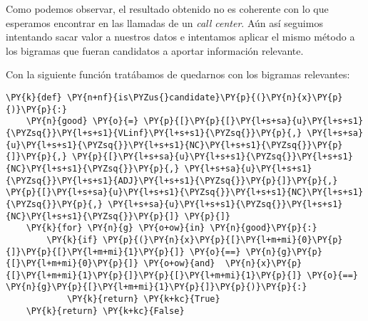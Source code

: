 Como podemos observar, el resultado obtenido no es coherente con lo que esperamos encontrar en las llamadas de un \textit{call center}. Aún así seguimos intentando sacar valor a nuestros datos e intentamos aplicar el mismo método a los bigramas que fueran candidatos a aportar información relevante. 

Con la siguiente función tratábamos de quedarnos con los bigramas relevantes: 
\vspace{0.5cm}

    \begin{tcolorbox}[breakable, size=fbox, boxrule=1pt, pad at break*=1mm,colback=cellbackground, colframe=cellborder]
\begin{Verbatim}[commandchars=\\\{\}]
\PY{k}{def} \PY{n+nf}{is\PYZus{}candidate}\PY{p}{(}\PY{n}{x}\PY{p}{)}\PY{p}{:}
	\PY{n}{good} \PY{o}{=} \PY{p}{[}\PY{p}{[}\PY{l+s+sa}{u}\PY{l+s+s1}{\PYZsq{}}\PY{l+s+s1}{VLinf}\PY{l+s+s1}{\PYZsq{}}\PY{p}{,} \PY{l+s+sa}{u}\PY{l+s+s1}{\PYZsq{}}\PY{l+s+s1}{NC}\PY{l+s+s1}{\PYZsq{}}\PY{p}{]}\PY{p}{,} \PY{p}{[}\PY{l+s+sa}{u}\PY{l+s+s1}{\PYZsq{}}\PY{l+s+s1}{NC}\PY{l+s+s1}{\PYZsq{}}\PY{p}{,} \PY{l+s+sa}{u}\PY{l+s+s1}{\PYZsq{}}\PY{l+s+s1}{ADJ}\PY{l+s+s1}{\PYZsq{}}\PY{p}{]}\PY{p}{,} \PY{p}{[}\PY{l+s+sa}{u}\PY{l+s+s1}{\PYZsq{}}\PY{l+s+s1}{NC}\PY{l+s+s1}{\PYZsq{}}\PY{p}{,} \PY{l+s+sa}{u}\PY{l+s+s1}{\PYZsq{}}\PY{l+s+s1}{NC}\PY{l+s+s1}{\PYZsq{}}\PY{p}{]} \PY{p}{]}
	\PY{k}{for} \PY{n}{g} \PY{o+ow}{in} \PY{n}{good}\PY{p}{:}
		\PY{k}{if} \PY{p}{(}\PY{n}{x}\PY{p}{[}\PY{l+m+mi}{0}\PY{p}{]}\PY{p}{[}\PY{l+m+mi}{1}\PY{p}{]} \PY{o}{==} \PY{n}{g}\PY{p}{[}\PY{l+m+mi}{0}\PY{p}{]} \PY{o+ow}{and}  \PY{n}{x}\PY{p}{[}\PY{l+m+mi}{1}\PY{p}{]}\PY{p}{[}\PY{l+m+mi}{1}\PY{p}{]} \PY{o}{==} \PY{n}{g}\PY{p}{[}\PY{l+m+mi}{1}\PY{p}{]}\PY{p}{)}\PY{p}{:}
			\PY{k}{return} \PY{k+kc}{True}
	\PY{k}{return} \PY{k+kc}{False}
	

\end{Verbatim}
\end{tcolorbox}
